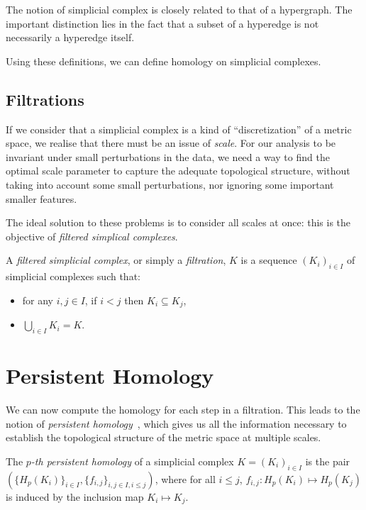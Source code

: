 \documentclass[a4paper,11pt,openany,extrafontsizes]{memoir}
\begin{document}
The notion of simplicial complex is closely related to that of a
hypergraph. The important distinction lies in the fact that a subset
of a hyperedge is not necessarily a hyperedge itself.

Using these definitions, we can define homology on simplicial
complexes. %

\subsection{Filtrations}%
\label{sec:filtrations}

If we consider that a simplicial complex is a kind of
``discretization'' of a metric space, we realise that there must be an
issue of \emph{scale}. For our analysis to be invariant under small
perturbations in the data, we need a way to find the optimal scale
parameter to capture the adequate topological structure, without
taking into account some small perturbations, nor ignoring some
important smaller features.


The ideal solution to these problems is to consider all scales at
once: this is the objective of \emph{filtered simplical complexes}.

\begin{defn}[Filtration]
  A \emph{filtered simplicial complex}, or simply a \emph{filtration},
  $K$ is a sequence ${(K_i)}_{i\in I}$ of simplicial complexes such
  that:
  \begin{itemize}
  \item for any $i, j \in I$, if $i < j$ then $K_i \subseteq K_j$,
  \item $\bigcup_{i\in I} K_i = K$.
  \end{itemize}
\end{defn}

\section{Persistent Homology}%
\label{sec:persistent-homology}

We can now compute the homology for each step in a filtration. This
leads to the notion of \emph{persistent
  homology}~\cite{carlsson_topology_2009,zomorodian_computing_2005},
which gives us all the information necessary to establish the
topological structure of the metric space at multiple scales.

\begin{defn}
  The \emph{$p$-th persistent homology} of a simplicial complex
  $K = {(K_i)}_{i\in I}$ is the pair
  $(\{H_p(K_i)\}_{i\in I}, \{f_{i,j}\}_{i,j\in I, i\leq j})$, where
  for all $i\leq j$, $f_{i,j} : H_p(K_i) \mapsto H_p(K_j)$ is induced
  by the inclusion map $K_i \mapsto K_j$.
\end{defn}
\end{document}
